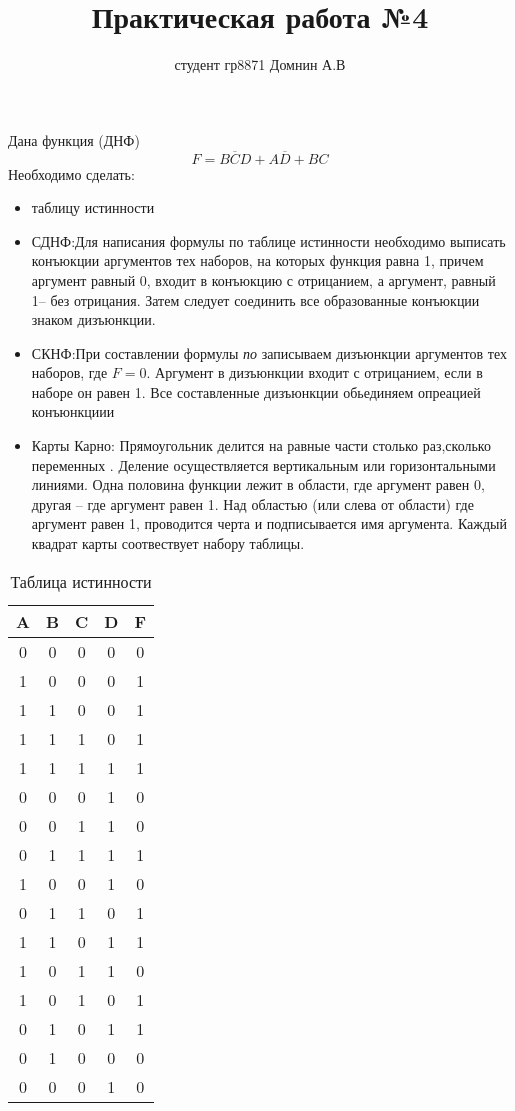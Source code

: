 \documentclass{article}
\title{Практическая работа №4}
\author{студент гр8871 Домнин А.В }
\begin{document}
\maketitle
\newcommand{\D}{10}
\newcommand{\I}{0.6}
\newcommand{\B}{0.2}
Дана функция (ДНФ)
$$
F=B\overline{C}D+A\overline{D}+BC
$$
Необходимо сделать:
\begin{itemize}
    \item таблицу истинности
    \item СДНФ:Для написания формулы по таблице истинности необходимо выписать конъюкции аргументов тех наборов, на которых функция равна 1, причем аргумент равный 0, входит в конъюкцию с отрицанием, а аргумент, равный 1-- без отрицания. Затем следует соединить все образованные конъюкции знаком дизъюнкции.
    \item СКНФ:При составлении формулы {\it по} записываем дизъюнкции аргументов тех наборов, где $F=0$. Аргумент в дизъюнкции входит с отрицанием, если в наборе он равен 1. Все составленные дизъюнкции обьединяем опреацией конъюнкциии
    \item Карты Карно: Прямоугольник делится на равные части столько раз,сколько переменных . Деление осуществляется вертикальным или горизонтальными линиями. Одна половина функции лежит в области, где аргумент равен 0, другая -- где аргумент равен 1. Над областью (или слева от области) где аргумент равен 1, проводится черта и подписывается имя аргумента. Каждый квадрат карты соотвествует набору таблицы.
\end{itemize}



\begin{table}[ht]
\centering
\begin{tabular}{|c|c|c|c|c|} \hline
A & B & C & D & F \\
\hline
0 & 0 & 0 & 0 & 0 \\%
\hline
1 & 0 & 0 & 0 & 1 \\%
\hline
1 & 1 & 0 & 0 & 1 \\%
\hline
1 & 1 & 1 & 0 & 1 \\%
\hline
1 & 1 & 1 & 1 & 1 \\%
\hline
0 & 0 & 0 & 1 & 0 \\%
\hline
0 & 0 & 1 & 1 & 0 \\%
\hline
0 & 1 & 1 & 1 & 1 \\%
\hline
1 & 0 & 0 & 1 & 0 \\%
\hline
0 & 1 & 1 & 0 & 1 \\%
\hline
1 & 1 & 0 & 1 & 1 \\%
\hline
1 & 0 & 1 & 1 & 0 \\%
\hline
1 & 0 & 1 & 0 & 1 \\%
\hline
0 & 1 & 0 & 1 & 1 \\%
\hline
0 & 1 & 0 & 0 & 0 \\%
\hline
0 & 0 & 0 & 1 & 0 \\%
\hline
\end{tabular}
\label{table}
\caption{Таблица истинности}
\end{table}
\end{document}
